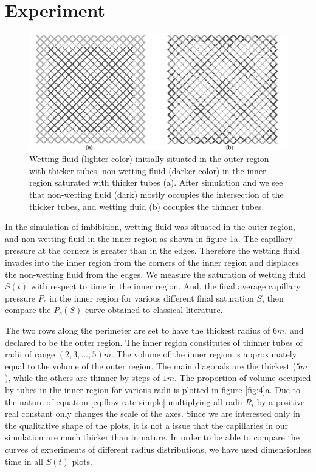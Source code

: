 \documentclass[
	12pt
] {article}
\begin{document}
\section{Experiment} \label{sec:rad-distb}
	\begin{figure}
		\centering
		\includegraphics[width=\textwidth]{fig_3_2200x1000}
		\caption{Wetting fluid (lighter color) initially situated in the outer region with thicker tubes, non-wetting fluid (darker color) in the inner region saturated with thicker tubes (a). After simulation and we see that non-wetting fluid (dark) mostly occupies the intersection of the thicker tubes, and wetting fluid (b) occupies the thinner tubes.}
		\label{fig:3}
	\end{figure}

	In the simulation of imbibition, wetting fluid was situated in the outer region, and non-wetting fluid in the inner region as shown in figure \ref{fig:3}a. The capillary pressure at the corners is greater than in the edges. Therefore the wetting fluid invades into the inner region from the corners of the inner region and displaces the non-wetting fluid from the edges. We measure the saturation of wetting fluid $S(t)$ with respect to time in the inner region. And, the final average capillary pressure $P_c$ in the inner region for various different final saturation $S$, then compare the $P_c(S)$ curve obtained to classical literature.
	
	The two rows along the perimeter are set to have the thickest radius of $6 m$, and declared to be the outer region. The inner region constitutes of thinner tubes of radii of range $(2, 3, ..., 5) m$. The volume of the inner region is approximately equal to the volume of the outer region. The main diagonals are the thickest ($5 m$), while the others are thinner by steps of $1 m$. The proportion of volume occupied by tubes in the inner region for various radii is plotted in figure \ref{fig:4}a. Due to the nature of equation \ref{eq:flow-rate-simple} multiplying all radii $R_i$ by a positive real constant only changes the scale of the axes. Since we are interested only in the qualitative shape of the plots, it is not a issue that the capillaries in our simulation are much thicker than in nature. In order to be able to compare the curves of experiments of different radius distributions, we have used dimensionless time in all $S(t)$ plots. 
	
\end{document}
